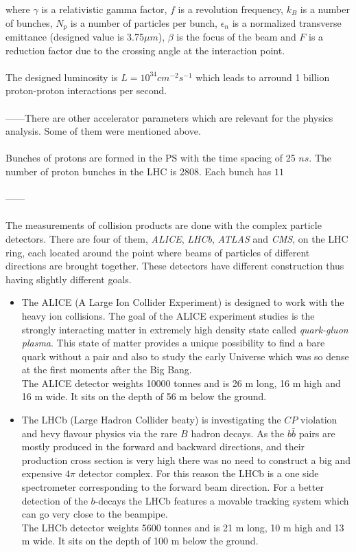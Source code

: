 where $\gamma$ is a relativistic gamma factor, $f$ is a revolution frequency, $k_{B}$ is a number of bunches,
$N_{p}$ is a number of particles per bunch, $\epsilon_{n}$ is a normalized transverse emittance (designed value
is 3.75$\mu m$), $\beta$ is the focus of the beam and $F$ is a reduction factor due to the crossing angle at the 
interaction point.
\\
\\
The designed luminosity is $L = 10^{34} cm^{-2}s^{-1}$ which leads to arround 1 billion proton-proton 
interactions per second.
\\
\\
------There are other accelerator parameters which are relevant for the physics analysis. Some of them were
mentioned above.
\\
\\
Bunches of protons are formed in the PS with the time spacing of 25 $ns$. The number of proton bunches in the LHC is
2808. Each bunch has $11 $
\\
\\
------
\\
\\
The measurements of collision products are done with the complex particle detectors. There are four of them, 
\textit{ALICE}, \textit{LHCb}, \textit{ATLAS} and \textit{CMS}, on the LHC
ring, each located around the point where beams of particles of different directions are brought together.
These detectors have different construction thus having slightly different goals.

\begin{itemize}
 \item The ALICE (A Large Ion Collider Experiment)\cite{ALICEtdr} is designed to
 work with the heavy ion collisions. The goal of the ALICE experiment studies is
 the strongly interacting matter in extremely high density state called \textit{quark-gluon plasma}. This 
 state of matter provides a unique possibility to find a bare quark without a pair and also to study the early
 Universe which was so dense at the first moments after the Big Bang.
 \\
 The ALICE detector weights 10000 tonnes and is 26 m long, 16 m high and 16 m wide. It sits on the depth of
 56 m below the ground.
 
 \item The LHCb (Large Hadron Collider beaty)\cite{LHCb} is investigating the $CP$ violation and hevy flavour physics via
 the rare $B$ hadron decays. As the $b\bar{b}$ pairs are mostly produced in the forward and backward directions, 
 and their production cross section is very high there was no need to construct a big and expensive $4\pi$ detector 
 complex. For this reason the LHCb is a one side spectrometer corresponding to the forward beam direction.
 For a better detection of the $b$-decays the LHCb features a movable tracking system which can go very close
 to the beampipe.
 \\
 The LHCb detector weights 5600 tonnes and is 21 m long, 10 m high and 13 m wide. It sits on the depth of 100 m 
 below the ground.
 
 
 
\end{itemize}

